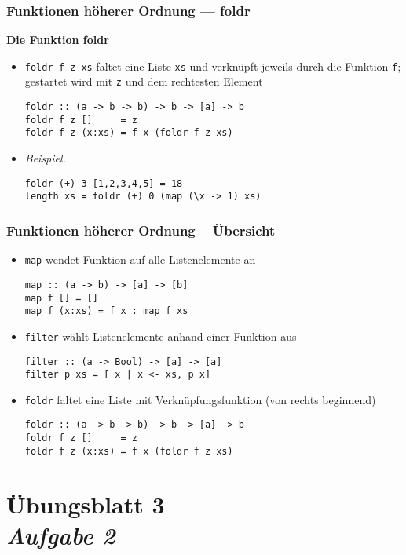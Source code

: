 \documentclass{beamer}
\begin{document}
\begin{frame}[fragile] \frametitle{Funktionen höherer Ordnung --- foldr}
	\textbf{Die Funktion foldr}
	\begin{itemize}
		\item \texttt{foldr f z xs} faltet eine Liste \texttt{xs} und verknüpft jeweils durch die Funktion \texttt{f}; gestartet wird mit \texttt{z} und dem rechtesten Element 
		\begin{lstlisting}
foldr :: (a -> b -> b) -> b -> [a] -> b
foldr f z []     = z 
foldr f z (x:xs) = f x (foldr f z xs) 
		\end{lstlisting}
		\item \emph{Beispiel.} \\
		\begin{lstlisting}
foldr (+) 3 [1,2,3,4,5] = 18
length xs = foldr (+) 0 (map (\x -> 1) xs)
		\end{lstlisting}
	\end{itemize}
\end{frame}


\begin{frame}[fragile] \frametitle{Funktionen höherer Ordnung -- Übersicht}
	\begin{itemize}
		\item \texttt{map} wendet Funktion auf alle Listenelemente an
		\begin{lstlisting}
map :: (a -> b) -> [a] -> [b]
map f [] = []
map f (x:xs) = f x : map f xs
		\end{lstlisting}
		\item \texttt{filter} wählt Listenelemente anhand einer Funktion aus
		\begin{lstlisting}
filter :: (a -> Bool) -> [a] -> [a]
filter p xs = [ x | x <- xs, p x]
		\end{lstlisting}
		\item \texttt{foldr} faltet eine Liste mit Verknüpfungsfunktion (von rechts beginnend)
		\begin{lstlisting}
foldr :: (a -> b -> b) -> b -> [a] -> b
foldr f z []     = z
foldr f z (x:xs) = f x (foldr f z xs) 
		\end{lstlisting}
	\end{itemize}
\end{frame}

\section{Übungsblatt 3 \\ \textit{\normalsize Aufgabe 2}}
\end{document}
